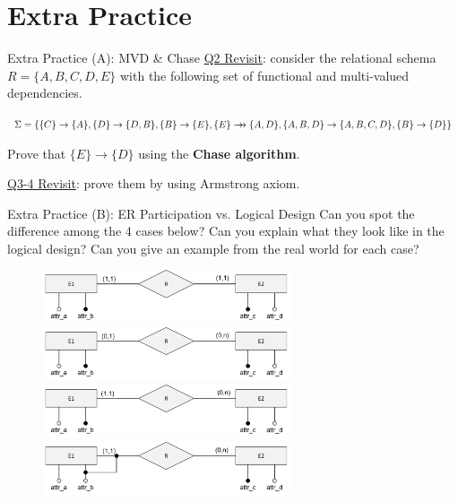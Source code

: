 \section*{Extra Practice}
\begin{frame}[fragile]{Extra Practice (A): MVD \& Chase}
\underline{Q2 Revisit}: consider the relational schema $R = \{A,B,C,D,E\}$ with the following set of functional and multi-valued dependencies.\\ \vspace{5pt}

$\Sigma=\{\{C\}\rightarrow\{A\}, \{D\}\rightarrow\{D,B\}, \{B\}\rightarrow\{E\},\{E\}\mbox{$\; \rightarrow \! \! \! \! \rightarrow \; $}\{A,D\},\{A,B,D\}\rightarrow\{A,B,C,D\},\{B\}\rightarrow\{D\}\}$\\ \vspace{5pt}

Prove that $\{E\}\rightarrow\{D\}$ using the \textbf{Chase algorithm}.\\ \vspace{25pt}

\underline{Q3-4 Revisit}: prove them by using Armstrong axiom.\\ 

\end{frame}

\begin{frame}[fragile]{Extra Practice (B): ER Participation vs. Logical Design}
Can you spot the difference among the 4 cases below? Can you explain what they look like in the logical design? Can you give an example from the real world for each case?\\ \vspace{4pt}
	
\begin{figure}
	\includegraphics[width=0.65\textwidth, trim=0 0 0 0, clip]{t4/images/case1.png}
	\includegraphics[width=0.65\textwidth, trim=0 0 0 0, clip]{t4/images/case2.png}
	\includegraphics[width=0.65\textwidth, trim=0 0 0 0, clip]{t4/images/case3.png}
	\includegraphics[width=0.65\textwidth, trim=0 0 0 0, clip]{t4/images/case4.png}
\end{figure}
\end{frame}

